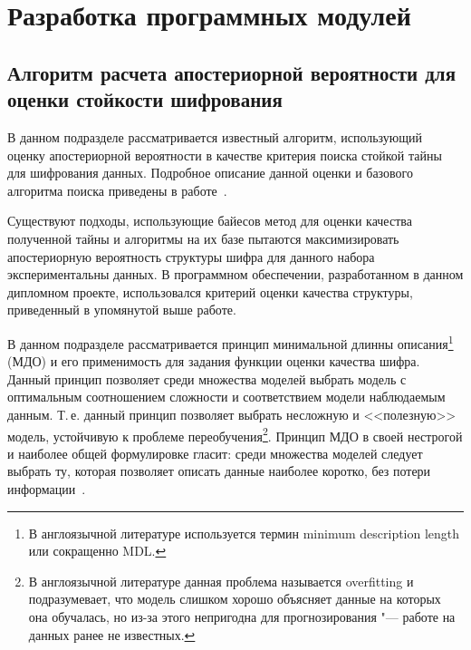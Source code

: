 \section{Разработка программных модулей}
\label{sec:develop_modules}

\subsection{Алгоритм расчета апостериорной вероятности для оценки стойкости шифрования}
\label{sub:develop_modules:k2_algorithm}

В данном подразделе рассматривается известный алгоритм, использующий оценку апостериорной вероятности в качестве критерия поиска стойкой тайны для шифрования данных.
Подробное описание данной оценки и базового алгоритма поиска приведены в работе~\cite{Cooper1991}.

Существуют подходы, использующие байесов метод для оценки качества полученной тайны и алгоритмы на их базе пытаются максимизировать апостериорную вероятность структуры шифра для данного набора экспериментальны данных.
В программном обеспечении, разработанном в данном дипломном проекте, использовался критерий оценки качества структуры, приведенный в упомянутой выше работе.

В данном подразделе рассматривается принцип минимальной длинны описания\footnote{В англоязычной литературе используется термин minimum description length или сокращенно MDL.} (МДО) и его применимость для задания функции оценки качества шифра.
Данный принцип позволяет среди множества моделей выбрать модель с оптимальным соотношением сложности и соответствием модели наблюдаемым данным.
Т.\,е. данный принцип позволяет выбрать несложную и <<полезную>> модель, устойчивую к проблеме переобучения\footnote{В англоязычной литературе данная проблема называется overfitting и подразумевает, что модель слишком хорошо объясняет данные на которых она обучалась, но из-за этого непригодна для прогнозирования "--- работе на данных ранее не известных.}.
Принцип МДО в своей нестрогой и наиболее общей формулировке гласит: среди множества моделей следует выбрать ту, которая позволяет описать данные наиболее коротко, без потери информации~\cite{Grunwald05atutorial}.

